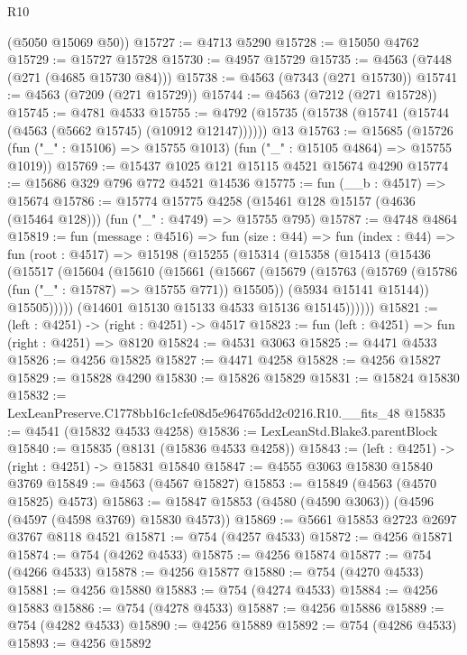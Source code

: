 \begin{lexlean}{R10}
\begin{coremodule}
      (@5050 @15069 @50))
@15727 := @4713 @5290
@15728 := @15050 @4762
@15729 := @15727 @15728
@15730 := @4957 @15729
@15735 := @4563 (@7448 (@271 (@4685 @15730 @84)))
@15738 := @4563 (@7343 (@271 @15730))
@15741 := @4563 (@7209 (@271 @15729))
@15744 := @4563 (@7212 (@271 @15728))
@15745 := @4781 @4533
@15755 := @4792 (@15735 (@15738 (@15741 (@15744 (@4563 (@5662 @15745) (@10912 @12147)))))) @13
@15763 := @15685
    (@15726 (fun ("_" : @15106) => @15755 @1013) (fun ("_" : @15105 @4864) => @15755 @1019))
@15769 := @15437 @1025 @121 @15115 @4521 @15674 @4290
@15774 := @15686 @329 @796 @772 @4521 @14536
@15775 := fun (__b : @4517) => @15674
@15786 := @15774
    @15775
    @4258
    (@15461 @128 @15157 (@4636 (@15464 @128)))
    (fun ("_" : @4749) => @15755 @795)
@15787 := @4748 @4864
@15819 := fun (message : @4516) =>
  fun (size : @44) =>
  fun (index : @44) =>
  fun (root : @4517) =>
  @15198
    (@15255
      (@15314
        (@15358
          (@15413
            (@15436
              (@15517
                (@15604
                  (@15610
                    (@15661
                      (@15667
                        (@15679
                          (@15763 (@15769 (@15786 (fun ("_" : @15787) => @15755 @771)) @15505))
                          (@5934 @15141 @15144))
                        @15505)))))
              (@14601 @15130 @15133 @4533 @15136 @15145))))))
@15821 := (left : @4251) -> (right : @4251) -> @4517
@15823 := fun (left : @4251) => fun (right : @4251) => @8120
@15824 := @4531 @3063
@15825 := @4471 @4533
@15826 := @4256 @15825
@15827 := @4471 @4258
@15828 := @4256 @15827
@15829 := @15828 @4290
@15830 := @15826 @15829
@15831 := @15824 @15830
@15832 := LexLeanPreserve.C1778bb16c1cfe08d5e964765dd2c0216.R10.__fits_48
@15835 := @4541 (@15832 @4533 @4258)
@15836 := LexLeanStd.Blake3.parentBlock
@15840 := @15835 (@8131 (@15836 @4533 @4258))
@15843 := (left : @4251) -> (right : @4251) -> @15831 @15840
@15847 := @4555 @3063 @15830 @15840 @3769
@15849 := @4563 (@4567 @15827)
@15853 := @15849 (@4563 (@4570 @15825) @4573)
@15863 := @15847 @15853 (@4580 (@4590 @3063)) (@4596 (@4597 (@4598 @3769) @15830 @4573))
@15869 := @5661 @15853 @2723 @2697 @3767 @8118 @4521
@15871 := @754 (@4257 @4533)
@15872 := @4256 @15871
@15874 := @754 (@4262 @4533)
@15875 := @4256 @15874
@15877 := @754 (@4266 @4533)
@15878 := @4256 @15877
@15880 := @754 (@4270 @4533)
@15881 := @4256 @15880
@15883 := @754 (@4274 @4533)
@15884 := @4256 @15883
@15886 := @754 (@4278 @4533)
@15887 := @4256 @15886
@15889 := @754 (@4282 @4533)
@15890 := @4256 @15889
@15892 := @754 (@4286 @4533)
@15893 := @4256 @15892

\end{coremodule}
\end{lexlean}
